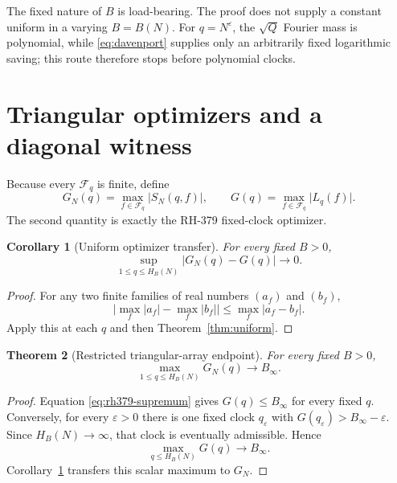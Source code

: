 \documentclass[11pt]{article}
\newtheorem{theorem}{Theorem}[section]
\newtheorem{corollary}[theorem]{Corollary}
\theoremstyle{definition}
\theoremstyle{remark}
\newcommand{\Fcal}{\mathcal F}
\newcommand{\abs}[1]{\lvert#1\rvert}
\begin{document}
The fixed nature of $B$ is load-bearing.  The proof does not supply a
constant uniform in a varying $B=B(N)$.  For $q=N^\varepsilon$, the
$\sqrt Q$ Fourier mass is polynomial, while \eqref{eq:davenport} supplies
only an arbitrarily fixed logarithmic saving; this route therefore stops
before polynomial clocks.

\section{Triangular optimizers and a diagonal witness}

Because every $\Fcal_q$ is finite, define
\begin{equation}
 G_N(q)=\max_{f\in\Fcal_q}\abs{S_N(q,f)},
 \qquad
 G(q)=\max_{f\in\Fcal_q}\abs{L_q(f)}.
 \label{eq:optimizers}
\end{equation}
The second quantity is exactly the RH-379 fixed-clock optimizer.

\begin{corollary}[Uniform optimizer transfer]
\label{cor:optimizer-transfer}
For every fixed $B>0$,
\begin{equation}
 \sup_{1\le q\le H_B(N)}\abs{G_N(q)-G(q)}\longrightarrow0.
 \label{eq:optimizer-uniform}
\end{equation}
\end{corollary}

\begin{proof}
For any two finite families of real numbers $(a_f)$ and $(b_f)$,
\[
 \abs{\max_f\abs{a_f}-\max_f\abs{b_f}}
 \le\max_f\abs{a_f-b_f}.
\]
Apply this at each $q$ and then Theorem~\ref{thm:uniform}.
\end{proof}

\begin{theorem}[Restricted triangular-array endpoint]
\label{thm:triangular-endpoint}
For every fixed $B>0$,
\begin{equation}
          \boxed{\displaystyle
          \max_{1\le q\le H_B(N)}G_N(q)\longrightarrow B_\infty.}
 \label{eq:triangular-endpoint}
\end{equation}
\end{theorem}

\begin{proof}
Equation \eqref{eq:rh379-supremum} gives $G(q)\le B_\infty$ for every
fixed $q$.  Conversely, for every $\varepsilon>0$ there is one fixed clock
$q_\varepsilon$ with $G(q_\varepsilon)>B_\infty-\varepsilon$.
Since $H_B(N)\to\infty$, that clock is eventually admissible.  Hence
\[
              \max_{q\le H_B(N)}G(q)\longrightarrow B_\infty.
\]
Corollary~\ref{cor:optimizer-transfer} transfers this scalar maximum to
$G_N$.
\end{proof}
\end{document}
